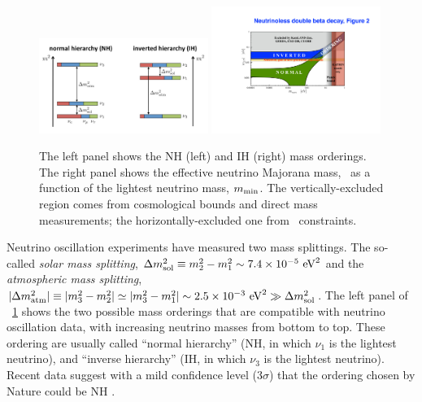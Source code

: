 \begin{figure}[h!]
\centering
\includegraphics[width=0.49\textwidth]{img/mass-hierarchy-jgu-mainz-web.jpg} \hfill
\includegraphics[width=0.49\textwidth]{img/APPECbetabetameff.pdf}
\caption{\small The left panel shows the NH (left) and IH (right) mass orderings. 
The right panel \cite{Giuliani:2019uno} shows the effective neutrino Majorana mass, \mbb\, as a function of the lightest neutrino mass, $m_{\rm min}$.
The vertically-excluded region comes from cosmological bounds and direct mass measurements; the horizontally-excluded one from \bbonu\ constraints.} \label{fig:numass_ordering}
\end{figure}

Neutrino oscillation experiments have measured two mass splittings. The so-called \emph{solar mass splitting}, $\Delta m^2_{ \rm sol}\equiv m^2_2-m^2_1\sim 7.4 \times
10^{-5}\ {\rm eV}^2$ and the
\emph{atmospheric mass splitting}, $|\Delta m^2_{\rm
atm}|\equiv |m^2_3-m^2_2|\simeq|m^2_3-m^2_1| \sim 2.5 \times 10^{-3}\ {\rm
eV}^2\gg \Delta m^2_{\rm sol}$. The left panel of \Fig~\ref{fig:numass_ordering} shows the two possible mass orderings that are compatible with neutrino oscillation data, with increasing neutrino masses from bottom to top. These ordering are usually called ``normal hierarchy'' (NH, in which $\nu_1$ is the lightest neutrino), and
``inverse hierarchy'' (IH, in which $\nu_3$ is the lightest neutrino). Recent data suggest with a mild confidence level (3$\sigma$) that the ordering chosen by Nature could be NH \cite{deSalas:2018bym}.

